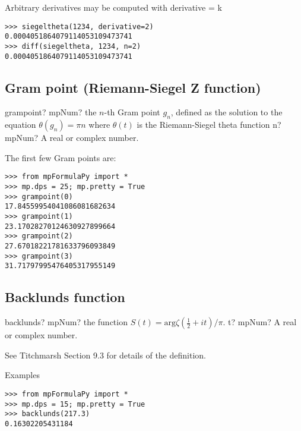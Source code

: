 Arbitrary derivatives may be computed with derivative = k

\begin{lstlisting}
>>> siegeltheta(1234, derivative=2)
0.0004051864079114053109473741
>>> diff(siegeltheta, 1234, n=2)
0.0004051864079114053109473741
\end{lstlisting}


\subsection{Gram point (Riemann-Siegel Z function)}

\begin{mpFunctionsExtract}
	\mpFunctionOne
	{grampoint? mpNum? the $n$-th Gram point $g_n$, defined as the solution to the equation $\theta(g_n)=\pi n$ where $\theta(t)$ is the Riemann-Siegel theta function}
	{n? mpNum? A real or complex number.}
\end{mpFunctionsExtract}


The first few Gram points are:

\begin{lstlisting}
>>> from mpFormulaPy import *
>>> mp.dps = 25; mp.pretty = True
>>> grampoint(0)
17.84559954041086081682634
>>> grampoint(1)
23.17028270124630927899664
>>> grampoint(2)
27.67018221781633796093849
>>> grampoint(3)
31.71797995476405317955149
\end{lstlisting}


\subsection{Backlunds function}

\begin{mpFunctionsExtract}
	\mpFunctionOne
	{backlunds? mpNum? the function $S(t) = \text{arg}\zeta\left(\tfrac{1}{2}+it\right)/\pi$.}
	{t? mpNum? A real or complex number.}
\end{mpFunctionsExtract}


\vpara
See Titchmarsh Section 9.3 for details of the definition.

Examples

\begin{lstlisting}
>>> from mpFormulaPy import *
>>> mp.dps = 15; mp.pretty = True
>>> backlunds(217.3)
0.16302205431184
\end{lstlisting}



\newpage
